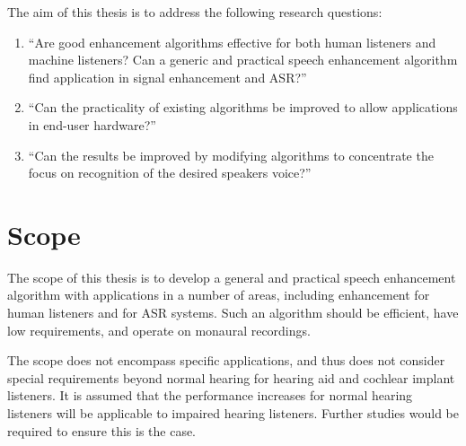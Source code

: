 \newcommand{\RQone}{``Are good enhancement algorithms effective for both human listeners and machine listeners? Can a generic and practical speech enhancement algorithm find application in signal enhancement and \ac{ASR}?''}
\newcommand{\RQthree}{``Can the results be improved by modifying algorithms to concentrate the focus on recognition of the desired speakers voice?''}
\newcommand{\RQtwo}{``Can the practicality of existing algorithms be improved to allow applications in end-user hardware?''}

The aim of this thesis is to address the following research questions:
\begin{enumerate}
\item \label{enu:ResQ1} \RQone{}
\item \label{enu:ResQ2}\RQtwo{}
\item \label{enu:ResQ3}\RQthree{}
\end{enumerate}

\section{Scope}

The scope of this thesis is to develop a general and practical speech
enhancement algorithm with applications in a number of areas, including
enhancement for human listeners and for \ac{ASR} systems. Such an
algorithm should be efficient, have low requirements, and operate
on monaural recordings.

The scope does not encompass specific applications, and thus does
not consider special requirements beyond normal hearing for hearing
aid and cochlear implant listeners. It is assumed that the performance
increases for normal hearing listeners will be applicable to impaired
hearing listeners. Further studies would be required to ensure this
is the case.
